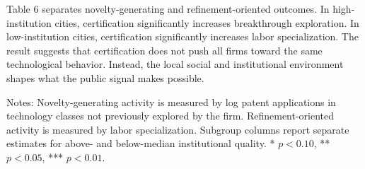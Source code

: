 \documentclass[12pt]{article}
\begin{document}
Table 6 separates novelty-generating and refinement-oriented outcomes. In high-institution cities, certification significantly increases breakthrough exploration. In low-institution cities, certification significantly increases labor specialization. The result suggests that certification does not push all firms toward the same technological behavior. Instead, the local social and institutional environment shapes what the public signal makes possible.

\begin{table}[htbp]
\centering
\caption{Innovation pathways by institutional environment}
\begin{minipage}{0.96\textwidth}
\footnotesize Notes: Novelty-generating activity is measured by log patent applications in technology classes not previously explored by the firm. Refinement-oriented activity is measured by labor specialization. Subgroup columns report separate estimates for above- and below-median institutional quality. * \(p<0.10\), ** \(p<0.05\), *** \(p<0.01\).
\end{minipage}
\end{table}
\end{document}
